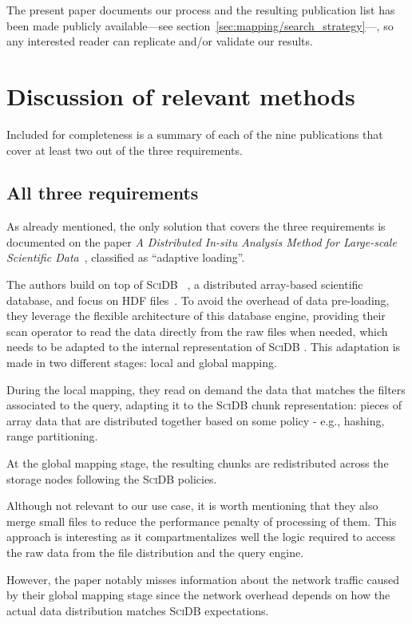 The present paper documents our process and the resulting
publication list has been made publicly available---see
section~\ref{sec:mapping/search_strategy}---, so any interested reader can
replicate and/or validate our results.

\section{Discussion of relevant methods}
\label{sec:mapping/details}
Included for completeness is a summary of each of the nine publications 
that cover at least two out of the three requirements.

\subsection{All three requirements}
\newcommand{\scidb}[0]{\textsc{SciDB} }

As already mentioned, the only solution that covers the three requirements is
documented on the paper
\textit{A Distributed In-situ Analysis Method for Large-scale
Scientific Data}~\cite{Han2017}, classified as ``adaptive loading''.

The authors build on top of \scidb~\cite{Stonebraker2011}, a distributed
array-based scientific database, and focus on \textsc{HDF} files~\cite{HDF}.
To avoid the overhead of data pre-loading, they leverage the flexible
architecture of this database engine, providing their scan operator to read
the data directly from the raw files when needed, which needs to be adapted
to the internal representation of \scidb.
This adaptation is made in two different stages: local and global mapping.

During the local mapping, they read on demand the data that matches the filters 
associated to the query, adapting it to the \scidb chunk representation: pieces 
of array data that are distributed together based on some policy - e.g., hashing, 
range partitioning.

At the global mapping stage, the resulting chunks are redistributed across the 
storage nodes following the \scidb policies.

Although not relevant to our use case, it is worth mentioning that they also
merge small files to reduce the performance penalty of processing
of them.
This approach is interesting as it compartmentalizes well the logic
required to access the raw data from the file distribution and the query engine.

However, the paper notably misses information about the network traffic caused 
by their global mapping stage since the network overhead depends on how the 
actual data distribution matches \scidb expectations.


